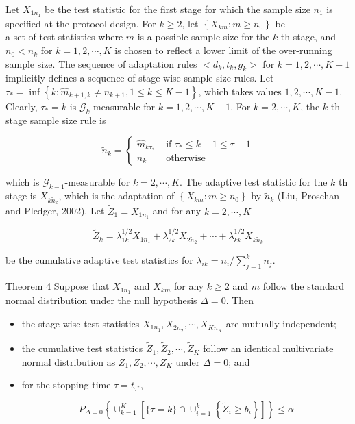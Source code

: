 \documentclass[10pt]{article}
\begin{document}
Let $X_{1 n_{1}}$ be the test statistic for the first stage for which the sample size $n_{1}$ is specified at the protocol design. For $k \geq 2$, let $\left\{X_{k m}: m \geq n_{0}\right\}$ be\\
a set of test statistics where $m$ is a possible sample size for the $k$ th stage, and $n_{0}<n_{k}$ for $k=1,2, \cdots, K$ is chosen to reflect a lower limit of the over-running sample size. The sequence of adaptation rules $<d_{k}, t_{k}, g_{k}>$ for $k=1,2, \cdots, K-1$ implicitly defines a sequence of stage-wise sample size rules. Let $\tau_{*}=\inf \left\{k: \hat{m}_{k+1, k} \neq n_{k+1}, 1 \leq k \leq K-1\right\}$, which takes values $1,2, \cdots, K-1$. Clearly, $\tau_{*}=k$ is $\mathcal{G}_{k}$-measurable for $k=1,2, \cdots, K-1$. For $k=2, \cdots, K$, the $k$ th stage sample size rule is

\[
\tilde{n}_{k}= \begin{cases}\hat{m}_{k \tau_{*}} & \text { if } \tau_{*} \leq k-1 \leq \tau-1  \tag{11}\\ n_{k} & \text { otherwise }\end{cases}
\]

which is $\mathcal{G}_{k-1}$-measurable for $k=2, \cdots, K$. The adaptive test statistic for the $k$ th stage is $X_{k \tilde{n}_{k}}$, which is the adaptation of $\left\{X_{k m}: m \geq n_{0}\right\}$ by $\tilde{n}_{k}$ (Liu, Proschan and Pledger, 2002). Let $\tilde{Z}_{1}=X_{1 n_{1}}$ and for any $k=2, \cdots, K$


\begin{equation*}
\tilde{Z}_{k}=\lambda_{1 k}^{1 / 2} X_{1 n_{1}}+\lambda_{2 k}^{1 / 2} X_{2 \tilde{n}_{2}}+\cdots+\lambda_{k k}^{1 / 2} X_{k \tilde{n}_{k}} \tag{12}
\end{equation*}


be the cumulative adaptive test statistics for $\lambda_{i k}=n_{i} / \sum_{j=1}^{k} n_{j}$.

Theorem 4 Suppose that $X_{1 n_{1}}$ and $X_{k m}$ for any $k \geq 2$ and $m$ follow the standard normal distribution under the null hypothesis $\Delta=0$. Then

\begin{itemize}
  \item[i)] the stage-wise test statistics $X_{1 n_{1}}, X_{2 \tilde{n}_{2}}, \cdots, X_{K \tilde{n}_{K}}$ are mutually independent;
  \item[ii)] the cumulative test statistics $\tilde{Z}_{1}, \tilde{Z}_{2}, \cdots, \tilde{Z}_{K}$ follow an identical multivariate normal distribution as $Z_{1}, Z_{2}, \cdots, Z_{K}$ under $\Delta=0$; and
  \item[iii)] for the stopping time $\tau=t_{\tau^{*}}$,

\begin{equation*}
P_{\Delta=0}\left\{\cup_{k=1}^{K}\left[\{\tau=k\} \cap \cup_{i=1}^{k}\left\{\tilde{Z}_{i} \geq b_{i}\right\}\right]\right\} \leq \alpha \tag{13}
\end{equation*}

\end{itemize}
\end{document}
